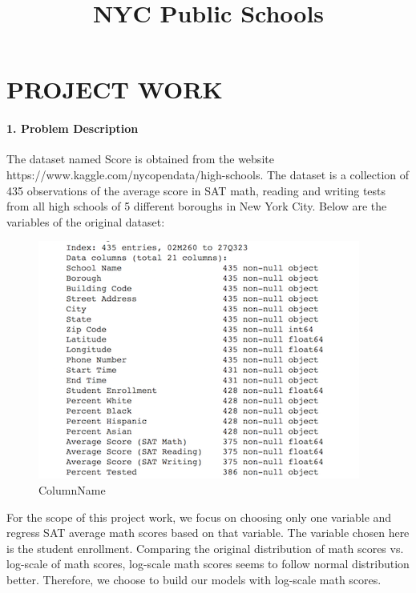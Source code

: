 \documentclass[11pt]{article}
\title{NYC Public Schools}
\makeatletter
\def\maxwidth{\ifdim\Gin@nat@width>\linewidth\linewidth
    \else\Gin@nat@width\fi}
\let\Oldincludegraphics\includegraphics
\renewcommand{\includegraphics}[1]{\Oldincludegraphics[width=.8\maxwidth]{#1}}
\makeatother
\begin{document}
    
    
    \maketitle
    
    

    
    \section{PROJECT WORK}\label{project-work}

\paragraph{1. Problem Description}\label{problem-description}

The dataset named Score is obtained from the website
https://www.kaggle.com/nycopendata/high-schools. The dataset is a
collection of 435 observations of the average score in SAT math, reading
and writing tests from all high schools of 5 different boroughs in New
York City. Below are the variables of the original dataset:

\begin{figure}
\centering
\includegraphics{./Fig/nyc/VariableNames.png}
\caption{ColumnName}
\end{figure}

For the scope of this project work, we focus on choosing only one
variable and regress SAT average math scores based on that variable. The
variable chosen here is the student enrollment. Comparing the original
distribution of math scores vs. log-scale of math scores, log-scale math
scores seems to follow normal distribution better. Therefore, we choose
to build our models with log-scale math scores.
\end{document}
